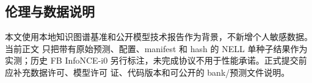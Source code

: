 \subsection{伦理与数据说明}

本文使用本地知识图谱基准和公开模型技术报告作为背景，不新增个人敏感数据。当前正文
只把带有原始预测、配置、manifest 和 hash 的 NELL 单种子结果作为实测；历史 FB
InfoNCE-i0 另行标注，未完成协议不用于性能承诺。正式提交前应补充数据许可、模型许可
证、代码版本和可公开的 bank/预测文件说明。

